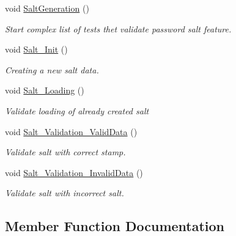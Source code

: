 \begin{DoxyCompactItemize}
void \mbox{\hyperlink{class_authority_controller_1_1_tests_1_1_data_a9b3556784bcd8b19d95f501e25057c1a}{Salt\+Generation}} ()
\begin{DoxyCompactList}\small\item\em Start complex list of tests thet validate password salt feature. \end{DoxyCompactList}\item 
void \mbox{\hyperlink{class_authority_controller_1_1_tests_1_1_data_aa13dc3c0c87d00ef411a7c131a3bd017}{Salt\+\_\+\+Init}} ()
\begin{DoxyCompactList}\small\item\em Creating a new salt data. \end{DoxyCompactList}\item 
void \mbox{\hyperlink{class_authority_controller_1_1_tests_1_1_data_a9418850b889e54b13753fb41002f8953}{Salt\+\_\+\+Loading}} ()
\begin{DoxyCompactList}\small\item\em Validate loading of already created salt \end{DoxyCompactList}\item 
void \mbox{\hyperlink{class_authority_controller_1_1_tests_1_1_data_a63fd3771fbfaab1a8901b8b3a6349af3}{Salt\+\_\+\+Validation\+\_\+\+Valid\+Data}} ()
\begin{DoxyCompactList}\small\item\em Validate salt with correct stamp. \end{DoxyCompactList}\item 
void \mbox{\hyperlink{class_authority_controller_1_1_tests_1_1_data_a0513557132acc1b9a94d893923ecc027}{Salt\+\_\+\+Validation\+\_\+\+Invalid\+Data}} ()
\begin{DoxyCompactList}\small\item\em Validate salt with incorrect salt. \end{DoxyCompactList}\end{DoxyCompactItemize}


\subsection{Member Function Documentation}
\mbox{\label{class_authority_controller_1_1_tests_1_1_data_ab2498d27006a8609210f5d814ca4126f}} 
